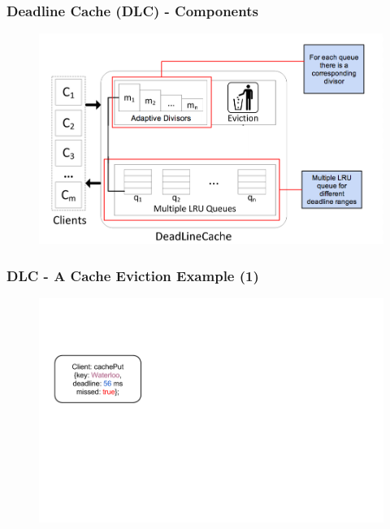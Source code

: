 \documentclass{beamer}
\begin{document}
\begin{frame}
  \frametitle{Deadline Cache (DLC) - Components}
  \begin{figure}
    \begin{center}
      \centerline{\includegraphics[scale=0.33]{img/DLC_ARC_2.png}}
    \end{center}
  \end{figure}
\end{frame}



\begin{frame}
  \frametitle{DLC - A Cache Eviction Example (1)}
  \begin{figure}
    \begin{center}
      \centerline{\includegraphics[scale=0.37]{img/DLC_V8_01.png}}
    \end{center}
  \end{figure}
\end{frame}
\end{document}
